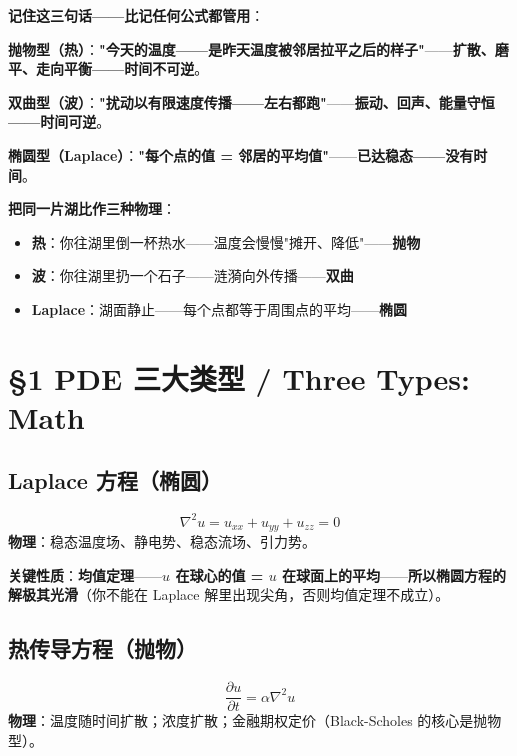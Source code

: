 \textbf{记住这三句话——比记任何公式都管用}：

\begin{tcolorbox}[colback=blue!4,colframe=blue!50,boxrule=0.6pt,arc=2pt]
\textbf{抛物型（热）}：\textbf{"今天的温度——是昨天温度被邻居拉平之后的样子"}——\textbf{扩散、磨平、走向平衡——\textbf{时间不可逆}}。

\medskip

\textbf{双曲型（波）}：\textbf{"扰动以有限速度传播——左右都跑"}——\textbf{振动、回声、能量守恒——\textbf{时间可逆}}。

\medskip

\textbf{椭圆型（Laplace）}：\textbf{"每个点的值 = 邻居的平均值"}——\textbf{已达稳态——\textbf{没有时间}}。
\end{tcolorbox}

\begin{example}[一句话记住三大类型]
\textbf{把同一片湖比作三种物理}：
\begin{itemize}
\item \textbf{热}：你往湖里倒一杯热水——温度会慢慢"摊开、降低"——\textbf{抛物}
\item \textbf{波}：你往湖里扔一个石子——涟漪向外传播——\textbf{双曲}
\item \textbf{Laplace}：湖面静止——每个点都等于周围点的平均——\textbf{椭圆}
\end{itemize}
\end{example}

\section{§1 PDE 三大类型 / Three Types: Math}

\subsection{Laplace 方程（椭圆）}
\begin{equation}
\nabla^2 u = u_{xx} + u_{yy} + u_{zz} = 0
\end{equation}
\textbf{物理}：稳态温度场、静电势、稳态流场、引力势。

\textbf{关键性质}：\textbf{均值定理}——\textbf{$u$ 在球心的值 = $u$ 在球面上的平均}——\textbf{所以椭圆方程的解\textbf{极其光滑}}（你不能在 Laplace 解里出现尖角，否则均值定理不成立）。

\subsection{热传导方程（抛物）}
\begin{equation}
\frac{\partial u}{\partial t} = \alpha \nabla^2 u
\end{equation}
\textbf{物理}：温度随时间扩散；浓度扩散；金融期权定价（Black-Scholes 的核心是抛物型）。

